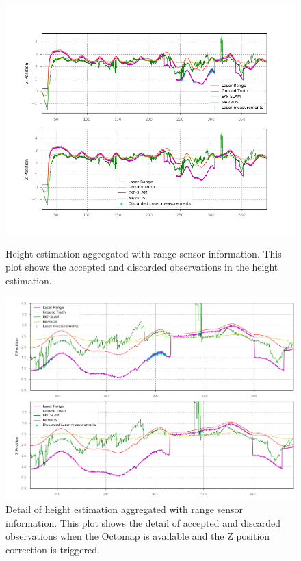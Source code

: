 \begin{figure}
    \centering
    \includegraphics[width=\textwidth]{Images/fig23-laser.png}
    \caption[Height estimation aggregated with range sensor information]{Height estimation aggregated with range sensor information. This plot shows the accepted and discarded observations in the height estimation.}
    \label{fig:chapter3:simulation:c:range-sensor}
    \centering
    \includegraphics[width=\textwidth]{Images/fig23-laser-detail.png}
    \caption[Detail of height estimation aggregated with range sensor information]{Detail of height estimation aggregated with range sensor information. This plot shows the detail of accepted and discarded observations when the Octomap is available and the Z position correction is triggered.}
    \label{fig:chapter3:simulation:c:range-sensor-detail}
\end{figure}

